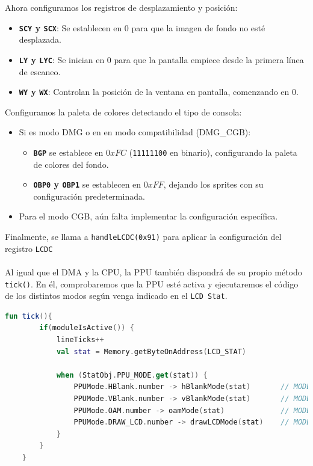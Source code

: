 Ahora configuramos los registros de desplazamiento y posición:
\begin{itemize}
    \item \textbf{\texttt{SCY} y \texttt{SCX}}: Se establecen en $0$ para que la imagen de fondo no esté desplazada.
    \item \textbf{\texttt{LY} y \texttt{LYC}}: Se inician en $0$ para que la pantalla empiece desde la primera línea de escaneo.
    \item \textbf{\texttt{WY} y \texttt{WX}}: Controlan la posición de la ventana en pantalla, comenzando en $0$.
\end{itemize}

Configuramos la paleta de colores detectando el tipo de consola:
\begin{itemize}
    \item Si es modo DMG o en en modo compatibilidad (DMG\_CGB):
    \begin{itemize}
        \item \textbf{\texttt{BGP}} se establece en $0xFC$ (\texttt{11111100} en binario), configurando la paleta de colores del fondo.
        \item \textbf{\texttt{OBP0} y \texttt{OBP1}} se establecen en $0xFF$, dejando los sprites con su configuración predeterminada.
    \end{itemize}
    \item Para el modo CGB, aún falta implementar la configuración específica.
\end{itemize}

Finalmente, se llama a \texttt{handleLCDC(0x91)} para aplicar la configuración del registro \texttt{LCDC}
\\\\
Al igual que el DMA y la CPU, la PPU también dispondrá de su propio método \texttt{tick()}. En él, comprobaremos que la PPU esté activa y ejecutaremos el código de los distintos modos según venga indicado en el \texttt{LCD Stat}.

\begin{lstlisting}[language=Kotlin, caption={Lógica principal de la PPU.}, label={code:pputick}]
    fun tick(){
        if(moduleIsActive()) {
            lineTicks++
            val stat = Memory.getByteOnAddress(LCD_STAT)

            when (StatObj.PPU_MODE.get(stat)) {
                PPUMode.HBlank.number -> hBlankMode(stat)       // MODE 0
                PPUMode.VBlank.number -> vBlankMode(stat)       // MODE 1
                PPUMode.OAM.number -> oamMode(stat)             // MODE 2
                PPUMode.DRAW_LCD.number -> drawLCDMode(stat)    // MODE 3
            }
        }
    }
\end{lstlisting}

